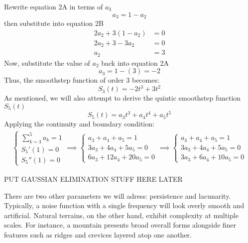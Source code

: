 Rewrite equation 2A in terms of $a_3$
\[a_3=1-a_2\]
then substitute into equation 2B
\begin{align*}
    2a_2+3(1-a_2)&=0\\
    2a_2+3-3a_2&=0\\
    a_2&=3
\end{align*}
Now, substitute the value of $a_2$ back into equation 2A
\[a_3=1-(3)=-2\]
Thus, the smoothstep function of order 3 becomes:
\begin{equation} \label{eq:3}
    S_3 (t)=-2t^3+3t^2
\end{equation}
As mentioned, we will also attempt to derive the quintic smoothstep function $S_5(t)$
\[S_5(t)=a_3t^3+a_4t^4+a_5t^5\]
Applying the continuity and boundary condition:
\begin{align}
    \begin{cases*}
        \sum_{k=3}^{5}a_k=1 \\
        S_5'(1)=0 \\
        S_5''(1)=0
    \end{cases*}
    \implies
    \begin{cases*}
        a_3+a_4+a_5=1\\
        3a_3+4a_4+5a_5=0\\
        6a_3+12a_4+20a_5=0
    \end{cases*}
    \implies
    \begin{cases*}
        a_3+a_4+a_5=1\\
        3a_3+4a_4+5a_5=0\\
        3a_3+6a_4+10a_5=0
    \end{cases*}
\end{align}

PUT GAUSSIAN ELIMINATION STUFF HERE LATER

There are two other parameters we will adress: persistence and lacunarity. Typically, a noise function with a single frequency will look 
overly smooth and artificial. Natural terrains, on the other hand, exhibit complexity at multiple scales. For instance, a mountain presents broad overall forms alongside finer features such 
as ridges and crevices layered atop one another.

